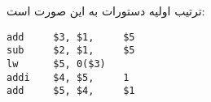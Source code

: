 ترتیب اولیه دستورات به این صورت است:

\setLTR
\begin{lstlisting}
add     $3, $1,     $5
sub     $2, $1,     $5
lw      $5, 0($3)
addi    $4, $5,     1
add     $5, $4,     $1
\end{lstlisting}
\setRTL